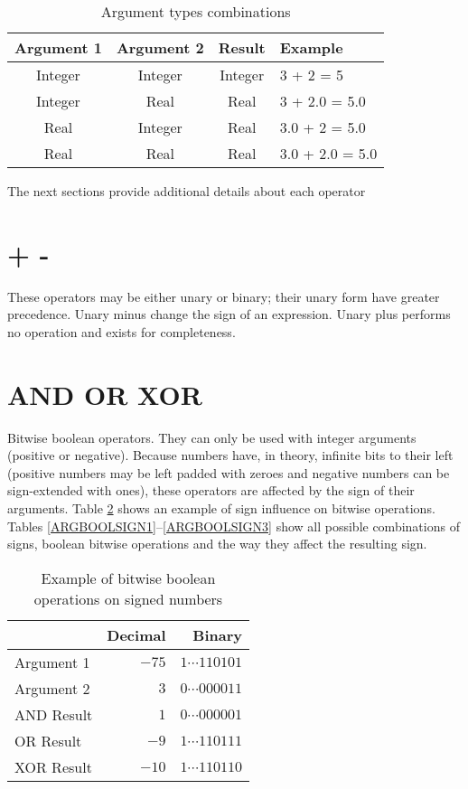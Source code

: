\documentclass[a4paper,draft,12pt]{book}
\begin{document}

\begin{table}[h]
\begin{center}
\begin{tabular}[h]{cccl}
\hline
Argument 1 & Argument 2 & Result & Example\\
\hline
Integer & Integer & Integer & 3 + 2 = 5\\
Integer & Real & Real & 3 + 2.0 = 5.0\\
Real & Integer & Real & 3.0 + 2 = 5.0\\
Real & Real & Real & 3.0 + 2.0 = 5.0\\
\hline
\end{tabular}
\caption{Argument types combinations}
\label{ARGCOMBTAB}
\end{center}
\end{table}

The next sections provide additional details about each operator

\section{+ -}
These operators may be either unary or binary; their unary form
have greater precedence. Unary minus change the sign of an expression.
Unary plus performs no operation and exists for completeness.

\section{AND OR XOR}
Bitwise boolean operators. They can only be used with integer arguments
(positive or negative). Because numbers have, in theory, infinite bits
to their left (positive numbers may be left padded with zeroes and
negative numbers can be sign-extended with ones), these operators
are affected by the sign of their arguments. Table \ref{BOOLEX} shows
an example of sign influence on bitwise operations. Tables
\ref{ARGBOOLSIGN1}--\ref{ARGBOOLSIGN3} show all possible combinations
of signs, boolean bitwise operations and the way they affect the resulting
sign.

\begin{table}[h]
\begin{center}
\begin{tabular}[h]{lrr}
\hline
           &            Decimal &            Binary\\
\hline
Argument 1 &              $-75$ &  $1\cdots 110101$\\
Argument 2 &               $ 3$ &  $0\cdots 000011$\\
AND Result &                $1$ &  $0\cdots 000001$\\
OR  Result &               $-9$ &  $1\cdots 110111$\\
XOR Result &              $-10$ &  $1\cdots 110110$\\
\hline
\end{tabular}
\caption{Example of bitwise boolean operations on signed numbers}
\label{BOOLEX}
\end{center}
\end{table}
\end{document}
